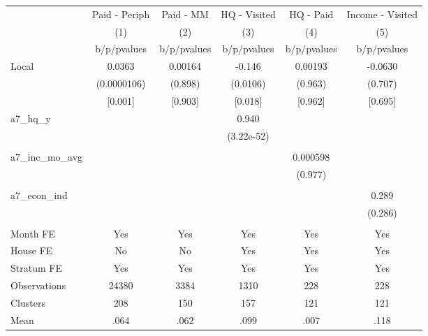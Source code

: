 {
\def\sym#1{\ifmmode^{#1}\else\(^{#1}\)\fi}
\begin{tabular}{l*{5}{c}}
\toprule
                &\multicolumn{1}{c}{Paid - Periph}&\multicolumn{1}{c}{Paid - MM}&\multicolumn{1}{c}{HQ - Visited}&\multicolumn{1}{c}{HQ - Paid}&\multicolumn{1}{c}{Income - Visited}\\
                &\multicolumn{1}{c}{(1)}&\multicolumn{1}{c}{(2)}&\multicolumn{1}{c}{(3)}&\multicolumn{1}{c}{(4)}&\multicolumn{1}{c}{(5)}\\
                &b/p/pvalues&b/p/pvalues&b/p/pvalues&b/p/pvalues&b/p/pvalues\\
\midrule
Local           &   0.0363&  0.00164&   -0.146&  0.00193&  -0.0630\\
                &(0.0000106)&  (0.898)& (0.0106)&  (0.963)&  (0.707)\\
                &  [0.001]&  [0.903]&  [0.018]&  [0.962]&  [0.695]\\
a7\_hq\_y         &         &         &    0.940&         &         \\
                &         &         &(3.22e-52)&         &         \\
                &         &         &         &         &         \\
a7\_inc\_mo\_avg   &         &         &         & 0.000598&         \\
                &         &         &         &  (0.977)&         \\
                &         &         &         &         &         \\
a7\_econ\_ind     &         &         &         &         &    0.289\\
                &         &         &         &         &  (0.286)\\
                &         &         &         &         &         \\
Month FE        &      Yes&      Yes&      Yes&      Yes&      Yes\\
House FE        &       No&       No&      Yes&      Yes&      Yes\\
Stratum FE      &      Yes&      Yes&      Yes&      Yes&      Yes\\
\midrule
Observations    &    24380&     3384&     1310&      228&      228\\
Clusters        &      208&      150&      157&      121&      121\\
Mean            &     .064&     .062&     .099&     .007&     .118\\
\bottomrule
\end{tabular}
}

